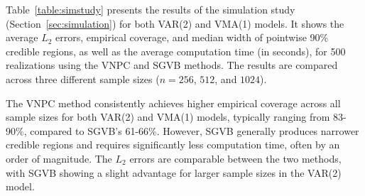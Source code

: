 \documentclass[%
 reprint,
 amsmath,amssymb,
 aps,
 nofootinbib,
]{revtex4-2}
\begin{document}
\label{appdx:simstudy}





Table~\ref{table:simstudy} presents the results of the simulation study (Section~\ref{sec:simulation}) for both VAR(2) and VMA(1) models. It shows the average $L_2$ errors, empirical coverage, and median width of pointwise 90\% credible regions, as well as the average computation time (in seconds), for 500 realizations using the VNPC and \ac{SGVB} methods. The results are compared across three different sample sizes ($n=256$, $512$, and $1024$).




The VNPC method consistently achieves higher empirical coverage across all sample sizes for both VAR(2) and VMA(1) models, typically ranging from 83-90\%, compared to SGVB's 61-66\%. However, SGVB generally produces narrower credible regions and requires significantly less computation time, often by an order of magnitude. The $L_2$ errors are comparable between the two methods, with SGVB showing a slight advantage for larger sample sizes in the VAR(2) model.
\end{document}
